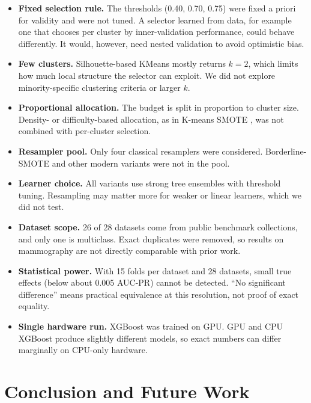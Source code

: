 \documentclass[11pt,a4paper]{article}
\begin{document}
\begin{itemize}
  \item \textbf{Fixed selection rule.} The thresholds (0.40, 0.70, 0.75) were fixed a priori for validity and were not tuned. A selector learned from data, for example one that chooses per cluster by inner-validation performance, could behave differently. It would, however, need nested validation to avoid optimistic bias.
  \item \textbf{Few clusters.} Silhouette-based KMeans mostly returns $k=2$, which limits how much local structure the selector can exploit. We did not explore minority-specific clustering criteria or larger $k$.
  \item \textbf{Proportional allocation.} The budget is split in proportion to cluster size. Density- or difficulty-based allocation, as in K-means SMOTE \cite{douzas2018kmeanssmote}, was not combined with per-cluster selection.
  \item \textbf{Resampler pool.} Only four classical resamplers were considered. Borderline-SMOTE \cite{han2005borderline} and other modern variants were not in the pool.
  \item \textbf{Learner choice.} All variants use strong tree ensembles with threshold tuning. Resampling may matter more for weaker or linear learners, which we did not test.
  \item \textbf{Dataset scope.} 26 of 28 datasets come from public benchmark collections, and only one is multiclass. Exact duplicates were removed, so results on mammography are not directly comparable with prior work.
  \item \textbf{Statistical power.} With 15 folds per dataset and 28 datasets, small true effects (below about 0.005 AUC-PR) cannot be detected. ``No significant difference'' means practical equivalence at this resolution, not proof of exact equality.
  \item \textbf{Single hardware run.} XGBoost was trained on GPU. GPU and CPU XGBoost produce slightly different models, so exact numbers can differ marginally on CPU-only hardware.
\end{itemize}

\section{Conclusion and Future Work}\label{sec:conclusion}
\end{document}
